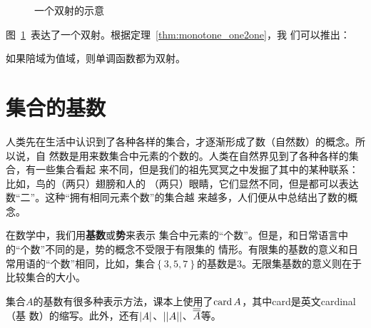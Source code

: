 \begin{figure}[ht]
    \centering
    \caption{一个双射的示意}\label{fig:map_biject}
\end{figure}

图~\ref{fig:map_biject}~表达了一个双射。根据定理~\ref{thm:monotone_one2one}，我
们可以推出：
\begin{rawthm}\label{thm:monotone_biject}
    如果陪域为值域，则单调函数都为双射。
\end{rawthm}

\section{集合的基数}

人类先在生活中认识到了各种各样的集合，才逐渐形成了数（自然数）的概念。所以说，自
然数是用来数集合中元素的个数的。人类在自然界见到了各种各样的集合，有一些集合看起
来不同，但是我们的祖先冥冥之中发掘了其中的某种联系：比如，鸟的（两只）翅膀和人的
（两只）眼睛，它们显然不同，但是都可以表达数“二”。这种“拥有相同元素个数”的集合越
来越多，人们便从中总结出了数的概念。\cite{dantzig2007number}

在数学中，我们用\textbf{基数}或\textbf{势}来表示
集合中元素的“个数”。但是，和日常语言中的“个数”不同的是，势的概念不受限于有限集的
情形。有限集的基数的意义和日常用语的“个数”相同，比如，集合$\left\{ 3,5,7 \right\}
$的基数是3。无限集基数的意义则在于比较集合的大小。

集合$A$的基数有很多种表示方法，课本上使用了$\operatorname{card} A$，其中card是英文cardinal（基
数）的缩写。此外，还有$\left|{A}\right|$、$\left|{\left|{A}\right|}\right|$、$\overline{\overline{{A}}}$等。


